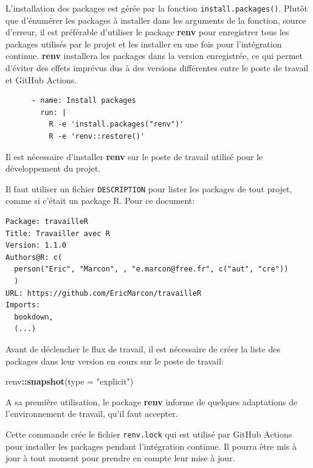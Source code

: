 \documentclass[
  12pt,
  french,
  a4paper,
  extrafontsizes,onecolumn,openright
  ]{memoir}
\newenvironment{Shaded}{\begin{snugshade}}{\end{snugshade}}
\newcommand{\DataTypeTok}[1]{\textcolor[rgb]{0.13,0.29,0.53}{#1}}
\newcommand{\KeywordTok}[1]{\textcolor[rgb]{0.13,0.29,0.53}{\textbf{#1}}}
\newcommand{\NormalTok}[1]{#1}
\newcommand{\OperatorTok}[1]{\textcolor[rgb]{0.81,0.36,0.00}{\textbf{#1}}}
\newcommand{\StringTok}[1]{\textcolor[rgb]{0.31,0.60,0.02}{#1}}
\begin{document}
L'installation des packages est gérée par la fonction \texttt{install.packages()}.
Plutôt que d'énumérer les packages à installer dans les arguments de la fonction, source d'erreur, il est préférable d'utiliser le package \textbf{renv} pour enregistrer tous les packages utilisés par le projet et les installer en une fois pour l'intégration continue.
\textbf{renv} installera les packages dans la version enregistrée, ce qui permet d'éviter des effets imprévus dus à des versions différentes entre le poste de travail et GitHub Actions.

\begin{verbatim}
      - name: Install packages
        run: |
          R -e 'install.packages("renv")'
          R -e 'renv::restore()'
\end{verbatim}

Il est nécessaire d'installer \textbf{renv} sur le poste de travail utilisé pour le développement du projet.

Il faut utiliser un fichier \texttt{DESCRIPTION} pour lister les packages de tout projet, comme si c'était un package R.
Pour ce document:

\begin{verbatim}
Package: travailleR
Title: Travailler avec R
Version: 1.1.0
Authors@R: c(
  person("Eric", "Marcon", , "e.marcon@free.fr", c("aut", "cre"))
  )
URL: https://github.com/EricMarcon/travailleR
Imports:
  bookdown,
  (...)
\end{verbatim}

Avant de déclencher le flux de travail, il est nécessaire de créer la liste des packages dans leur version en cours sur le poste de travail:

\scriptsize

\begin{Shaded}
\begin{Highlighting}[]
\NormalTok{renv}\OperatorTok{::}\KeywordTok{snapshot}\NormalTok{(}\DataTypeTok{type =} \StringTok{"explicit"}\NormalTok{)}
\end{Highlighting}
\end{Shaded}

\normalsize

A sa première utilisation, le package \textbf{renv} informe de quelques adaptations de l'environnement de travail, qu'il faut accepter.

Cette commande crée le fichier \texttt{renv.lock} qui est utilisé par GitHub Actions pour installer les packages pendant l'intégration continue.
Il pourra être mis à jour à tout moment pour prendre en compte leur mise à jour.
\end{document}
